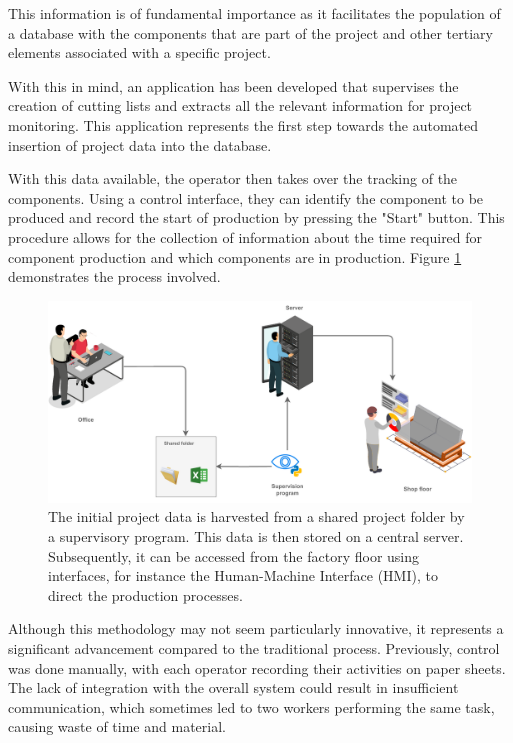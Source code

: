 This information is of fundamental importance as it facilitates the population of a database with the components that are part of the project and other tertiary elements associated with a specific project.

With this in mind, an application has been developed that supervises the creation of cutting lists and extracts all the relevant information for project monitoring. This application represents the first step towards the automated insertion of project data into the database.

With this data available, the operator then takes over the tracking of the components. Using a control interface, they can identify the component to be produced and record the start of production by pressing the "Start" button. This procedure allows for the collection of information about the time required for component production and which components are in production. Figure \ref{fig:projectTraceability} demonstrates the process involved.

\begin{figure}[!ht]
    \centering
    \includegraphics[width=.75\linewidth]{images/Development/chap3/File sharing.pdf}
    \caption{The initial project data is harvested from a shared project folder by a supervisory program. This data is then stored on a central server. Subsequently, it can be accessed from the factory floor using interfaces, for instance the Human-Machine Interface (HMI), to direct the production processes.}
    \label{fig:projectTraceability}
\end{figure}

Although this methodology may not seem particularly innovative, it represents a significant advancement compared to the traditional process. Previously, control was done manually, with each operator recording their activities on paper sheets. The lack of integration with the overall system could result in insufficient communication, which sometimes led to two workers performing the same task, causing waste of time and material.


